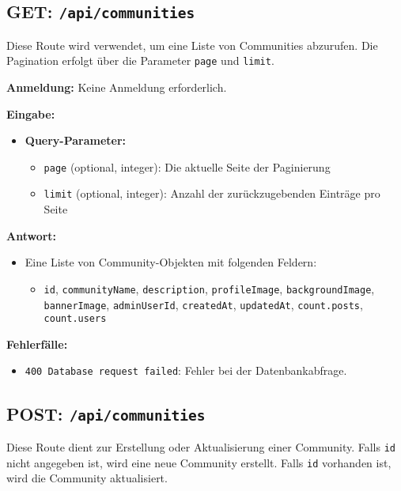 \documentclass[a4paper,12pt]{article}
\begin{document}
\newpage
\subsection{GET: \texttt{/api/communities}}

Diese Route wird verwendet, um eine Liste von Communities abzurufen. Die
Pagination erfolgt über die Parameter \texttt{page} und \texttt{limit}.

\textbf{Anmeldung:} Keine Anmeldung erforderlich.

\textbf{Eingabe:}
\begin{itemize}
    \item \textbf{Query-Parameter:}
    \begin{itemize}
        \item \texttt{page} (optional, integer):
            Die aktuelle Seite der Paginierung
        \item \texttt{limit} (optional, integer):
            Anzahl der zurückzugebenden Einträge pro Seite
    \end{itemize}
\end{itemize}

\textbf{Antwort:}
\begin{itemize}
    \item Eine Liste von Community-Objekten mit folgenden Feldern:
    \begin{itemize}
        \item \texttt{id},
              \texttt{communityName},
              \texttt{description},
              \texttt{profileImage},
              \texttt{backgroundImage},
              \texttt{bannerImage},
              \texttt{adminUserId},
              \texttt{createdAt},
              \texttt{updatedAt},
              \texttt{count.posts},
              \texttt{count.users}
    \end{itemize}
\end{itemize}

\textbf{Fehlerfälle:}
\begin{itemize}
    \item \texttt{400 Database request failed}: Fehler bei der Datenbankabfrage.
\end{itemize}

\newpage
\subsection{POST: \texttt{/api/communities}}

Diese Route dient zur Erstellung oder Aktualisierung einer Community. Falls
\texttt{id} nicht angegeben ist, wird eine neue Community erstellt. Falls
\texttt{id} vorhanden ist, wird die Community aktualisiert.
\end{document}
